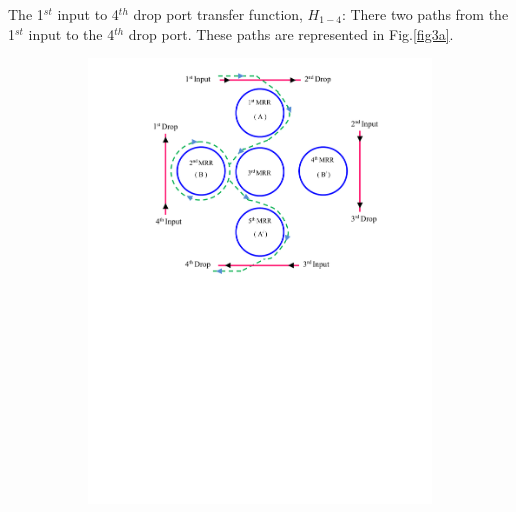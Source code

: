\documentclass{osa-article}
\begin{document}
The 1$^{st}$ input to 4$^{th}$ drop port transfer function, $H_{1-4}$: 
There two paths from the 1$^{st}$ input to the 4$^{th}$ drop port. These paths are represented in Fig.\ref{fig3a}.

\begin{figure}[h!]
  \centering
    \begin{subfigure}[b]{0.4\linewidth}
    \includegraphics[width=\linewidth]{figs/fig3a_141.pdf}
    \caption{}
  \end{subfigure}
  \begin{subfigure}[b]{0.4\linewidth}

\end{subfigure}
\end{figure}
\end{document}
